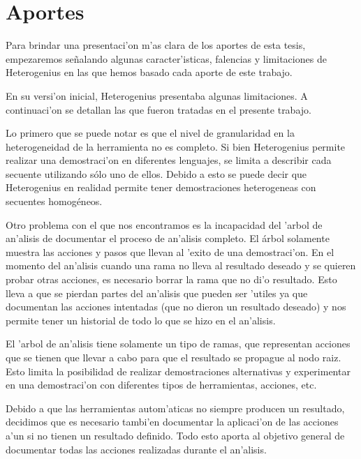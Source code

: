 \chapter{Aportes}

Para brindar una presentaci'on m'as clara de los aportes de esta tesis, empezaremos se\~nalando algunas caracter'isticas, falencias y limitaciones de Heterogenius en las que hemos basado cada aporte de este trabajo.

En su versi'on inicial, Heterogenius presentaba algunas limitaciones. 
A continuaci'on se detallan las que fueron tratadas en el presente trabajo.

Lo primero que se puede notar es que el nivel de granularidad en la heterogeneidad de la herramienta no es completo. 
Si bien Heterogenius permite realizar una demostraci'on en diferentes lenguajes, se limita a describir cada secuente utilizando sólo uno de ellos. 
Debido a esto se puede decir que Heterogenius en realidad permite tener demostraciones heterogeneas con secuentes homogéneos. 

Otro problema con el que nos encontramos es la incapacidad del 'arbol de an'alisis de documentar el proceso de an'alisis completo. El árbol solamente muestra las acciones y pasos que llevan al 'exito de una demostraci'on. En el momento del an'alisis cuando una rama no lleva al resultado deseado y se quieren probar otras acciones, es necesario borrar la rama que no di'o resultado. Esto lleva a que se pierdan partes del an'alisis que pueden ser 'utiles ya que documentan las acciones intentadas (que no dieron un resultado deseado) y nos permite tener un historial de todo lo que se hizo en el an'alisis.

El 'arbol de an'alisis tiene solamente un tipo de ramas, que representan acciones que se tienen que llevar a cabo para que el resultado se propague al nodo raiz. Esto limita la posibilidad de realizar demostraciones alternativas y experimentar en una demostraci'on con diferentes tipos de herramientas, acciones, etc.

Debido a que las herramientas autom'aticas no siempre producen un resultado, decidimos que es necesario tambi'en documentar la aplicaci'on de las acciones a'un si no tienen un resultado definido. Todo esto aporta al objetivo general de documentar todas las acciones realizadas durante el an'alisis.









